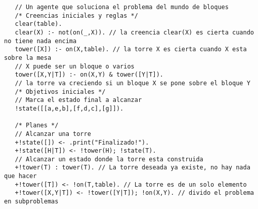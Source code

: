 \begin{lstlisting}
   // Un agente que soluciona el problema del mundo de bloques
   /* Creencias iniciales y reglas */
   clear(table).
   clear(X) :- not(on(_,X)). // la creencia clear(X) es cierta cuando no tiene nada encima
   tower([X]) :- on(X,table). // la torre X es cierta cuando X esta sobre la mesa
   // X puede ser un bloque o varios
   tower([X,Y|T]) :- on(X,Y) & tower([Y|T]).
   // la torre va creciendo si un bloque X se pone sobre el bloque Y
   /* Objetivos iniciales */
   // Marca el estado final a alcanzar
   !state([[a,e,b],[f,d,c],[g]]).

   /* Planes */
   // Alcanzar una torre
   +!state([]) <- .print("Finalizado!").
   +!state([H|T]) <- !tower(H); !state(T).
   // Alcanzar un estado donde la torre esta construida
   +!tower(T) : tower(T). // La torre deseada ya existe, no hay nada que hacer
   +!tower([T]) <- !on(T,table). // La torre es de un solo elemento
   +!tower([X,Y|T]) <- !tower([Y|T]); !on(X,Y). // divido el problema en subproblemas
\end{lstlisting}